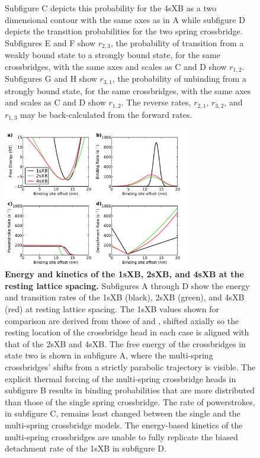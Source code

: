 \documentclass[]{article}
\begin{document}
\begin{figure}[htbp]
\begin{center}
{        Subfigure C depicts this probability for the 4sXB as a two dimensional contour with the same axes as in A while subfigure D depicts the transition probabilities for the two spring crossbridge.
        Subfigures E and F show $r_{2,3}$, the probability of transition from a weakly bound state to a strongly bound state, for the same crossbridges, with the same axes and scales as C and D show $r_{1,2}$.
        Subfigures G and H show $r_{3,1}$, the probability of unbinding from a strongly bound state, for the same crossbridges, with the same axes and scales as C and D show $r_{1,2}$.
        The reverse rates, $r_{2,1}$, $r_{3,2}$, and $r_{1,3}$ may be back-calculated from the forward rates.
    }
    \end{center}
\end{figure}

\begin{figure}[htbp]
    \begin{center}
    \includegraphics[width=3.2in]{../imgs/Figure3.pdf}
    \caption{
        \label{fig_kinetics_cuts}
        \textbf{Energy and kinetics of the 1sXB, 2sXB, and 4sXB at the resting lattice spacing.}
        Subfigures A through D show the energy and transition rates of the 1sXB (black), 2sXB (green), and 4sXB (red) at resting lattice spacing.
        The 1sXB values shown for comparison are derived from those of \citet{Daniel1998} and \citet{Tanner2007}, shifted axially so the resting location of the crossbridge head in each case is aligned with that of the 2sXB and 4sXB. 
        The free energy of the crossbridges in state two is shown in subfigure A, where the multi-spring crossbridges' shifts from a strictly parabolic trajectory is visible.
        The explicit thermal forcing of the multi-spring crossbridge heads in subfigure B results in binding probabilities that are more distributed than those of the single spring crossbridge.
        The rate of powerstrokes, in subfigure C, remains least changed between the single and the multi-spring crossbridge models.
        The energy-based kinetics of the multi-spring crossbridges are unable to fully replicate the biased detachment rate of the 1sXB in subfigure D. 
    }
    \end{center}
\end{figure}
\end{document}
